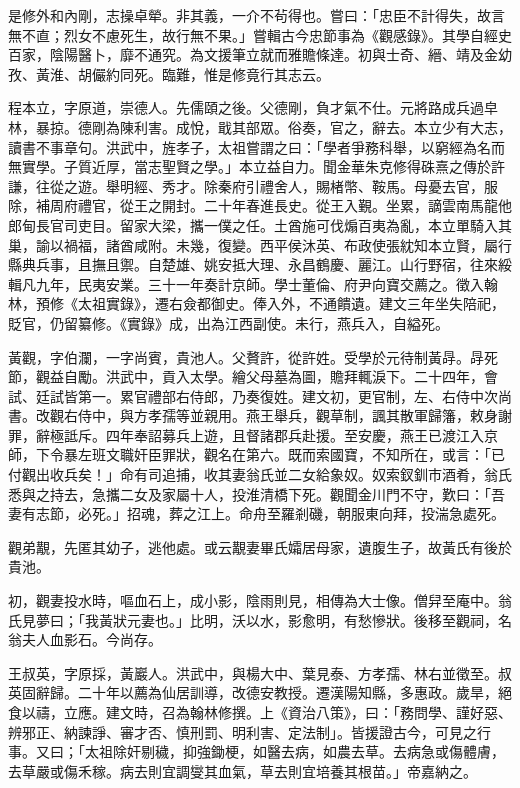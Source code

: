 \begin{pinyinscope}
是修外和內剛，志操卓犖。非其義，一介不茍得也。嘗曰：「忠臣不計得失，故言無不直；烈女不慮死生，故行無不果。」嘗輯古今忠節事為《觀感錄》。其學自經史百家，陰陽醫卜，靡不通究。為文援筆立就而雅贍條達。初與士奇、縉、靖及金幼孜、黃淮、胡儼約同死。臨難，惟是修竟行其志云。

程本立，字原道，崇德人。先儒頤之後。父德剛，負才氣不仕。元將路成兵過皁林，暴掠。德剛為陳利害。成悅，戢其部眾。俗奏，官之，辭去。本立少有大志，讀書不事章句。洪武中，旌孝子，太祖嘗謂之曰：「學者爭務科舉，以窮經為名而無實學。子質近厚，當志聖賢之學。」本立益自力。聞金華朱克修得硃熹之傳於許謙，往從之遊。舉明經、秀才。除秦府引禮舍人，賜楮幣、鞍馬。母憂去官，服除，補周府禮官，從王之開封。二十年春進長史。從王入覲。坐累，謫雲南馬龍他郎甸長官司吏目。留家大梁，攜一僕之任。土酋施可伐煽百夷為亂，本立單騎入其巢，諭以禍福，諸酋咸附。未幾，復變。西平侯沐英、布政使張紞知本立賢，屬行縣典兵事，且撫且禦。自楚雄、姚安抵大理、永昌鶴慶、麗江。山行野宿，往來綏輯凡九年，民夷安業。三十一年奏計京師。學士董倫、府尹向寶交薦之。徵入翰林，預修《太祖實錄》，遷右僉都御史。俸入外，不通饋遺。建文三年坐失陪祀，貶官，仍留纂修。《實錄》成，出為江西副使。未行，燕兵入，自縊死。

黃觀，字伯瀾，一字尚賓，貴池人。父贅許，從許姓。受學於元待制黃冔。冔死節，觀益自勵。洪武中，貢入太學。繪父母墓為圖，贍拜輒淚下。二十四年，會試、廷試皆第一。累官禮部右侍郎，乃奏復姓。建文初，更官制，左、右侍中次尚書。改觀右侍中，與方孝孺等並親用。燕王舉兵，觀草制，諷其散軍歸籓，敕身謝罪，辭極詆斥。四年奉詔募兵上遊，且督諸郡兵赴援。至安慶，燕王已渡江入京師，下令暴左班文職奸臣罪狀，觀名在第六。既而索國寶，不知所在，或言：「已付觀出收兵矣！」命有司追捕，收其妻翁氏並二女給象奴。奴索釵釧市酒肴，翁氏悉與之持去，急攜二女及家屬十人，投淮清橋下死。觀聞金川門不守，歎曰：「吾妻有志節，必死。」招魂，葬之江上。命舟至羅剎磯，朝服東向拜，投湍急處死。

觀弟覯，先匿其幼子，逃他處。或云覯妻畢氏孀居母家，遺腹生子，故黃氏有後於貴池。

初，觀妻投水時，嘔血石上，成小影，陰雨則見，相傳為大士像。僧舁至庵中。翁氏見夢曰；「我黃狀元妻也。」比明，沃以水，影愈明，有愁慘狀。後移至觀祠，名翁夫人血影石。今尚存。

王叔英，字原採，黃巖人。洪武中，與楊大中、葉見泰、方孝孺、林右並徵至。叔英固辭歸。二十年以薦為仙居訓導，改德安教授。遷漢陽知縣，多惠政。歲旱，絕食以禱，立應。建文時，召為翰林修撰。上《資治八策》，曰：「務問學、謹好惡、辨邪正、納諫諍、審才否、慎刑罰、明利害、定法制」。皆援證古今，可見之行事。又曰；「太祖除奸剔穢，抑強鋤梗，如醫去病，如農去草。去病急或傷體膚，去草嚴或傷禾稼。病去則宜調燮其血氣，草去則宜培養其根苗。」帝嘉納之。


\end{pinyinscope}

